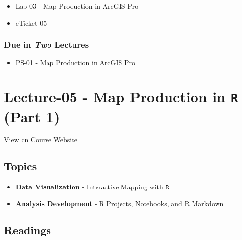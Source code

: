 \documentclass[
]{book}
\providecommand{\tightlist}{%
  \setlength{\itemsep}{0pt}\setlength{\parskip}{0pt}}
\begin{document}
\begin{itemize}
\tightlist
\item
  Lab-03 - Map Production in ArcGIS Pro
\item
  eTicket-05
\end{itemize}

\hypertarget{due-in-two-lectures}{%
\subsubsection*{\texorpdfstring{Due in \emph{Two} Lectures}{Due in Two Lectures}}\label{due-in-two-lectures}}

\begin{itemize}
\tightlist
\item
  PS-01 - Map Production in ArcGIS Pro
\end{itemize}

\hypertarget{lecture-05---map-production-in-r-part-1}{%
\section*{\texorpdfstring{Lecture-05 - Map Production in \texttt{R} (Part 1)}{Lecture-05 - Map Production in R (Part 1)}}\label{lecture-05---map-production-in-r-part-1}}

View on Course Website

\hypertarget{topics-5}{%
\subsection*{Topics}\label{topics-5}}

\begin{itemize}
\tightlist
\item
  \textbf{Data Visualization} - Interactive Mapping with \texttt{R}
\item
  \textbf{Analysis Development} - R Projects, Notebooks, and R Markdown
\end{itemize}

\hypertarget{readings-6}{%
\subsection*{Readings}\label{readings-6}}
\end{document}
